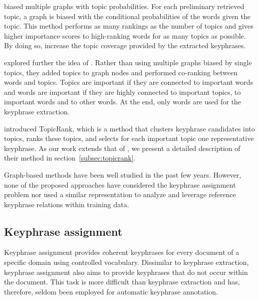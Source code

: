      biased multiple graphs with topic
    probabilities. For each preliminary retrieved topic, a graph is biased with
    the conditional probabilities of the words given the topic. This method
    performs as many rankings as the number of topics and gives higher importance
    scores to high-ranking words for as many topics as possible. By doing so,
    increase the topic coverage provided by the extracted keyphrases.
    
    
     explored further the idea of
    . Rather than using  multiple graphs biased by
    single topics, they added topics to graph nodes and performed co-ranking
    between words and topics. Topics are important if they are connected to
    important words and words are important if they are highly connected to important
    topics, to important words and to other words. At the end, only words are used for
    the keyphrase extraction.
    
      introduced TopicRank, which is a method that
    clusters keyphrase candidates into topics, ranks these topics, and selects for
    each important topic one representative keyphrase.
    As our work extends that of , we present a
    detailed description of their method in section~\ref{subsec:topicrank}.
    
    Graph-based methods have been well studied in the past few years. However, none
    of the proposed approaches have considered the keyphrase assignment problem nor
    used a similar representation to analyze and leverage reference keyphrase
    relations within training data.

  \subsection{Keyphrase assignment}
  \label{subsec:aka}
    Keyphrase assignment provides coherent keyphrases for every document of a specific domain using
    controlled vocabulary. Dissimilar to keyphrase extraction, keyphrase assignment also
    aims to provide keyphrases that do not occur within the document. This task is more
    difficult than keyphrase extraction and has, therefore, seldom been employed for automatic
    keyphrase annotation.


